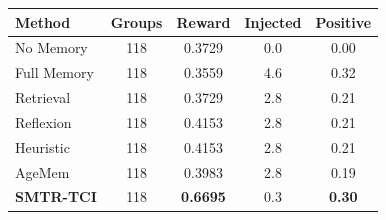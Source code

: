 \begin{tabular}{lcccc}
\toprule
Method & Groups & Reward & Injected & Positive \\
\midrule
No Memory & 118 & 0.3729 & 0.0 & 0.00 \\
Full Memory & 118 & 0.3559 & 4.6 & 0.32 \\
Retrieval & 118 & 0.3729 & 2.8 & 0.21 \\
Reflexion & 118 & 0.4153 & 2.8 & 0.21 \\
Heuristic & 118 & 0.4153 & 2.8 & 0.21 \\
AgeMem & 118 & 0.3983 & 2.8 & 0.19 \\
\textbf{SMTR-TCI} & 118 & \textbf{0.6695} & 0.3 & \textbf{0.30} \\
\bottomrule
\end{tabular}
